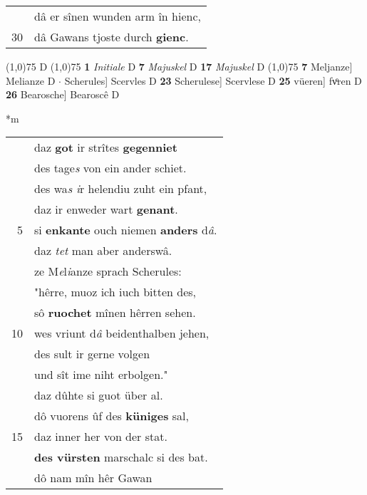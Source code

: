 \documentclass[8pt,a4paper,notitlepage]{article}
\begin{document}
\begin{table}[ht]
\begin{minipage}[t]{0.5\linewidth}
\begin{tabular}{rl}
 & dâ er sînen wunden arm în hienc,\\ 
30 & dâ Gawans tjoste durch \textbf{gienc}.\\ 
\end{tabular}
\scriptsize
\line(1,0){75} \newline
D \newline
\line(1,0){75} \newline
\textbf{1} \textit{Initiale} D  \textbf{7} \textit{Majuskel} D  \textbf{17} \textit{Majuskel} D  \newline
\line(1,0){75} \newline
\textbf{7} Meljanze] Melianze D  $\cdot$ Scherules] Scervles D \textbf{23} Scherulese] Scervlese D \textbf{25} vüeren] fvͦren D \textbf{26} Bearosche] Bearoscê D \newline
\end{minipage}
\hspace{0.5cm}
\begin{minipage}[t]{0.5\linewidth}
\small
\begin{center}*m
\end{center}
\begin{tabular}{rl}
 & daz \textbf{got} ir strîtes \textbf{gegenniet}\\ 
 & des tage\textit{s} von ein ander schiet.\\ 
 & des wa\textit{s i}r helendiu zuht ein pfant,\\ 
 & daz ir enweder wart \textbf{genant}.\\ 
5 & si \textbf{en}\textbf{kante} ouch niemen \textbf{anders} d\textit{â}.\\ 
 & daz \textit{tet} man aber anderswâ.\\ 
 & ze M\textit{e}l\textit{i}anze sprach Scherules:\\ 
 & "hêrre, muoz ich iuch bitten des,\\ 
 & sô \textbf{ruochet} mînen hêrren sehen.\\ 
10 & wes vriunt d\textit{â} beidenthalben jehen,\\ 
 & des sult ir gerne volgen\\ 
 & und sît ime niht erbolgen."\\ 
 & daz dûhte si guot über al.\\ 
 & dô vuorens ûf des \textbf{küniges} sal,\\ 
15 & daz inner her von der stat.\\ 
 & \textbf{des vürsten} marschalc si des bat.\\ 
 & dô nam mîn hêr Gawan\\ 

\end{tabular}
\end{minipage}
\end{table}
\end{document}
